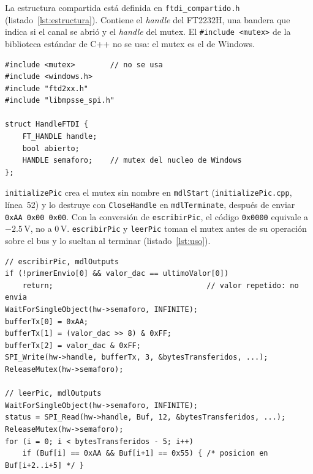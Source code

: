 \documentclass[11pt]{article}
\newcommand{\code}[1]{\texttt{#1}}
\begin{document}
La estructura compartida está definida en \code{ftdi\_compartido.h}
(listado~\ref{lst:estructura}). Contiene el \emph{handle} del FT2232H, una
bandera que indica si el canal se abrió y el \emph{handle} del mutex. El
\code{\#include <mutex>} de la biblioteca estándar de C++ no se usa: el mutex
es el de Windows.

\noindent\begin{minipage}{\linewidth}
\begin{lstlisting}[caption={Estructura compartida
  (\code{SIMULINK/WritePicModificado/ftdi\_compartido.h}).},
  label=lst:estructura]
#include <mutex>        // no se usa
#include <windows.h>
#include "ftd2xx.h"
#include "libmpsse_spi.h"

struct HandleFTDI {
    FT_HANDLE handle;
    bool abierto;
    HANDLE semaforo;    // mutex del nucleo de Windows
};
\end{lstlisting}
\end{minipage}

\code{initializePic} crea el mutex sin nombre en \code{mdlStart}
(\code{initializePic.cpp}, línea~52) y lo destruye con \code{CloseHandle} en
\code{mdlTerminate}, después de enviar \code{0xAA 0x00 0x00}. Con la
conversión de \code{escribirPic}, el código \code{0x0000} equivale a
$-2.5$\,V, no a 0\,V. \code{escribirPic} y \code{leerPic} toman el mutex antes
de su operación sobre el bus y lo sueltan al terminar
(listado~\ref{lst:uso}).

\noindent\begin{minipage}{\linewidth}
\begin{lstlisting}[caption={Uso del mutex en \code{escribirPic.cpp}
  (líneas 174--220) y \code{leerPic.cpp} (líneas 110--125), resumido.},
  label=lst:uso]
// escribirPic, mdlOutputs
if (!primerEnvio[0] && valor_dac == ultimoValor[0])
    return;                                   // valor repetido: no envia
WaitForSingleObject(hw->semaforo, INFINITE);
bufferTx[0] = 0xAA;
bufferTx[1] = (valor_dac >> 8) & 0xFF;
bufferTx[2] = valor_dac & 0xFF;
SPI_Write(hw->handle, bufferTx, 3, &bytesTransferidos, ...);
ReleaseMutex(hw->semaforo);

// leerPic, mdlOutputs
WaitForSingleObject(hw->semaforo, INFINITE);
status = SPI_Read(hw->handle, Buf, 12, &bytesTransferidos, ...);
ReleaseMutex(hw->semaforo);
for (i = 0; i < bytesTransferidos - 5; i++)
    if (Buf[i] == 0xAA && Buf[i+1] == 0x55) { /* posicion en Buf[i+2..i+5] */ }
\end{lstlisting}
\end{minipage}
\end{document}
